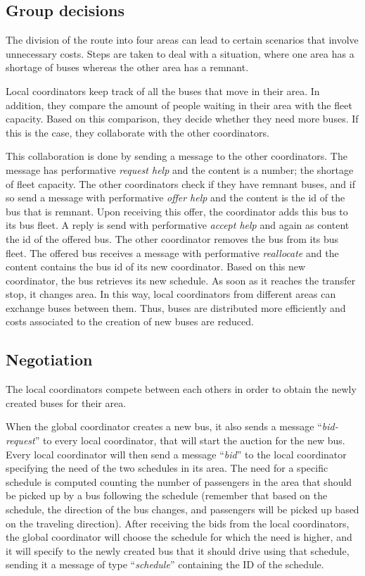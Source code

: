 \subsection{Group decisions}

The division of the route into four areas can lead to certain scenarios that involve unnecessary costs. Steps are taken to deal with a situation, where one area has a shortage of buses whereas the other area has a remnant. 

Local coordinators keep track of all the buses that move in their area. In addition, they compare the amount of people waiting in their area with the fleet capacity. Based on this comparison, they decide whether they need more buses. If this is the case, they collaborate with the other coordinators. 

This collaboration is done by sending a message to the other coordinators. The message has performative \textit{request help} and the content is a number; the shortage of fleet capacity. The other coordinators check if they have remnant buses, and if so send a message with performative \textit{offer help} and the content is the id of the bus that is remnant. Upon receiving this offer, the coordinator adds this bus to its bus fleet. A reply is send with performative \textit{accept help} and again as content the id of the offered bus. The other coordinator removes the bus from its bus fleet. The offered bus receives a message with performative \textit{reallocate} and the content contains the bus id of its new coordinator. Based on this new coordinator, the bus retrieves its new schedule. As soon as it reaches the transfer stop, it changes area. In this way, local coordinators from different areas can exchange buses between them. Thus, buses are distributed more efficiently and costs associated to the creation of new buses are reduced.

\subsection{Negotiation}
\label{subsec:negotiations}

The local coordinators compete between each others in order to obtain the newly created buses for their area.

When the global coordinator creates a new bus, it also sends a message ``\textit{bid-request}'' to every local coordinator, that will start the auction for the new bus. Every local coordinator will then send a message ``\textit{bid}'' to the local coordinator specifying the need of the two schedules in its area. The need for a specific schedule is computed counting the number of passengers in the area that should be picked up by a bus following the schedule (remember that based on the schedule, the direction of the bus changes, and passengers will be picked up based on the traveling direction). After receiving the bids from the local coordinators, the global coordinator will choose the schedule for which the need is higher, and it will specify to the newly created bus that it should drive using that schedule, sending it a message of type ``\textit{schedule}'' containing the ID of the schedule.

